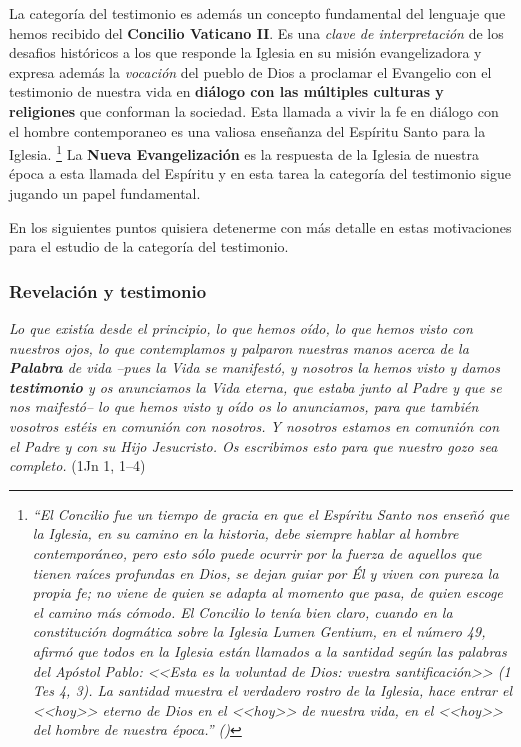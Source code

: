 \documentclass[11pt]{article}
\begin{document}
La categoría del testimonio es además un concepto fundamental del lenguaje que hemos recibido del \textbf{Concilio Vaticano II}. Es una \emph{clave de interpretación} de los desafios históricos a los que responde la Iglesia en su misión evangelizadora y expresa además la \emph{vocación} del pueblo de Dios a proclamar el Evangelio con el testimonio de nuestra vida en \textbf{diálogo con las múltiples culturas y religiones} que conforman la sociedad. Esta llamada a vivir la fe en diálogo con el hombre contemporaneo es una valiosa enseñanza del Espíritu Santo para la Iglesia.
\footnote{ 
\emph{
``El Concilio fue un tiempo de gracia en que el Espíritu Santo nos enseñó que la Iglesia, en su camino en la historia, debe siempre hablar al hombre contemporáneo, pero esto sólo puede ocurrir por la fuerza de aquellos que tienen raíces profundas en Dios, se dejan guiar por Él y viven con pureza la propia fe; no viene de quien se adapta al momento que pasa, de quien escoge el camino más cómodo. El Concilio lo tenía bien claro, cuando en la constitución dogmática sobre la Iglesia Lumen Gentium, en el número 49, afirmó que todos en la Iglesia están llamados a la santidad según las palabras del Apóstol Pablo: <<Esta es la voluntad de Dios: vuestra santificación>> (1 Tes 4, 3). La santidad muestra el verdadero rostro de la Iglesia, hace entrar el <<hoy>> eterno de Dios en el <<hoy>> de nuestra vida, en el <<hoy>> del hombre de nuestra época.'' (\cite{benxvi})
}
}
La \textbf{Nueva Evangelización} es la respuesta de la Iglesia de nuestra época a esta llamada del Espíritu y en esta tarea la categoría del testimonio sigue jugando un papel fundamental. 

En los siguientes puntos quisiera detenerme con más detalle en estas motivaciones para el estudio de la categoría del testimonio.

\subsubsection{Revelación y testimonio}

\emph{Lo que existía desde el principio, lo que hemos oído,
lo que hemos visto con nuestros ojos,
lo que contemplamos
y palparon nuestras manos
acerca de la \textbf{Palabra} de vida
--pues la Vida se manifestó,
y nosotros la hemos visto y damos \textbf{testimonio}
y os anunciamos la Vida eterna,
que estaba junto al Padre y que se nos maifestó--
lo que hemos visto y oído os lo anunciamos,
para que también vosotros estéis en comunión con nosotros.
Y nosotros estamos en comunión con el Padre y con su Hijo Jesucristo.
Os escribimos esto para que nuestro gozo sea completo.} (1Jn 1, 1--4)
\end{document}

